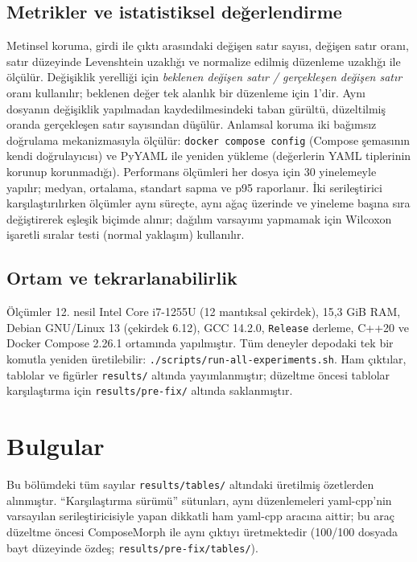 \documentclass[conference]{IEEEtran}
\begin{document}
\subsection{Metrikler ve istatistiksel değerlendirme}
Metinsel koruma, girdi ile çıktı arasındaki değişen satır sayısı, değişen
satır oranı, satır düzeyinde Levenshtein uzaklığı ve normalize edilmiş
düzenleme uzaklığı ile ölçülür. Değişiklik yerelliği için
\emph{beklenen değişen satır / gerçekleşen değişen satır} oranı kullanılır;
beklenen değer tek alanlık bir düzenleme için 1'dir. Aynı dosyanın
değişiklik yapılmadan kaydedilmesindeki taban gürültü, düzeltilmiş oranda
gerçekleşen satır sayısından düşülür. Anlamsal koruma iki bağımsız
doğrulama mekanizmasıyla ölçülür: \texttt{docker compose config} (Compose şemasının
kendi doğrulayıcısı) ve PyYAML ile yeniden yükleme (değerlerin YAML
tiplerinin korunup korunmadığı). Performans ölçümleri her dosya için 30
yinelemeyle yapılır; medyan, ortalama, standart sapma ve p95 raporlanır.
İki serileştirici karşılaştırılırken ölçümler aynı süreçte, aynı ağaç
üzerinde ve yineleme başına sıra değiştirerek eşleşik biçimde alınır;
dağılım varsayımı yapmamak için Wilcoxon işaretli sıralar testi (normal
yaklaşım) kullanılır.

\subsection{Ortam ve tekrarlanabilirlik}
Ölçümler 12. nesil Intel Core i7-1255U (12 mantıksal çekirdek), 15,3 GiB
RAM, Debian GNU/Linux 13 (çekirdek 6.12), GCC 14.2.0, \texttt{Release}
derleme, C++20 ve Docker Compose 2.26.1 ortamında yapılmıştır. Tüm
deneyler depodaki tek bir komutla yeniden üretilebilir:
\texttt{./scripts/run-all-experiments.sh}. Ham çıktılar, tablolar ve
figürler \texttt{results/} altında yayımlanmıştır; düzeltme öncesi
tablolar karşılaştırma için \texttt{results/pre-fix/} altında saklanmıştır.

\section{Bulgular}
\label{sec:bulgular}

Bu bölümdeki tüm sayılar \texttt{results/tables/} altındaki üretilmiş
özetlerden alınmıştır. ``Karşılaştırma sürümü'' sütunları, aynı düzenlemeleri
yaml-cpp'nin varsayılan serileştiricisiyle yapan dikkatli ham yaml-cpp
aracına aittir; bu araç düzeltme öncesi ComposeMorph ile aynı çıktıyı
üretmektedir (100/100 dosyada bayt düzeyinde özdeş;
\texttt{results/pre-fix/tables/}).
\end{document}
